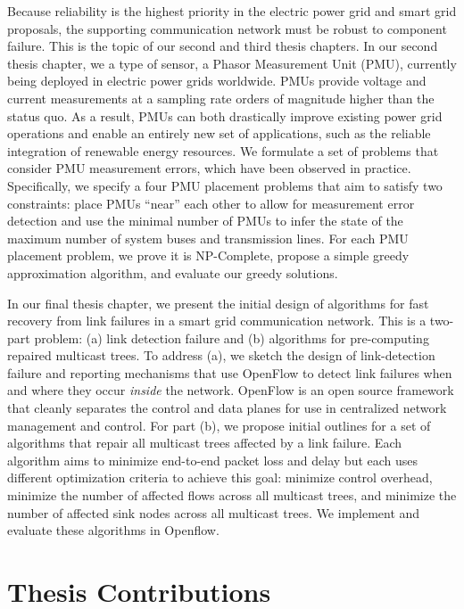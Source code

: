 Because reliability is the highest priority in the electric power grid and smart grid proposals, the supporting communication network must be robust to component failure.  This is the topic of our second and third thesis chapters. 
In our second thesis chapter, we a type of sensor, a Phasor Measurement Unit (PMU), currently being deployed in electric power grids worldwide. 
PMUs provide voltage and current measurements at a sampling rate orders of magnitude higher than the status quo.  As a result, PMUs can 
both drastically improve existing power grid operations and enable an entirely new set of applications, such as the reliable integration of renewable energy resources. 
We formulate a set of problems that consider PMU measurement errors, which have been observed in practice.  Specifically, we specify a four PMU placement problems
that aim to satisfy two constraints: place PMUs ``near'' each other to allow for measurement error detection and use the minimal number of PMUs to infer the state of the maximum number of system buses and transmission lines. 
For each PMU placement problem, we prove it is NP-Complete, propose a simple greedy approximation algorithm, and evaluate our greedy solutions.

In our final thesis chapter, we present the initial design of algorithms for fast recovery from link failures in a smart grid communication network. 
This is a two-part problem: (a) link detection failure and (b) algorithms for pre-computing repaired multicast trees.  
To address (a), we sketch the design of link-detection failure and reporting mechanisms that use OpenFlow to detect link failures when and where they occur \emph{inside} the network.
OpenFlow is an open source framework that cleanly separates the control and data planes for use in centralized network management and control.
For part (b), we propose initial outlines for a set of algorithms that repair all multicast trees affected by a link failure. Each algorithm aims to minimize end-to-end packet loss and delay but each uses different optimization criteria to
achieve this goal: minimize control overhead, minimize the number of affected flows across all multicast trees, and minimize the number of affected sink nodes across all multicast trees.
We implement and evaluate these algorithms in Openflow. 






\section{Thesis Contributions}



